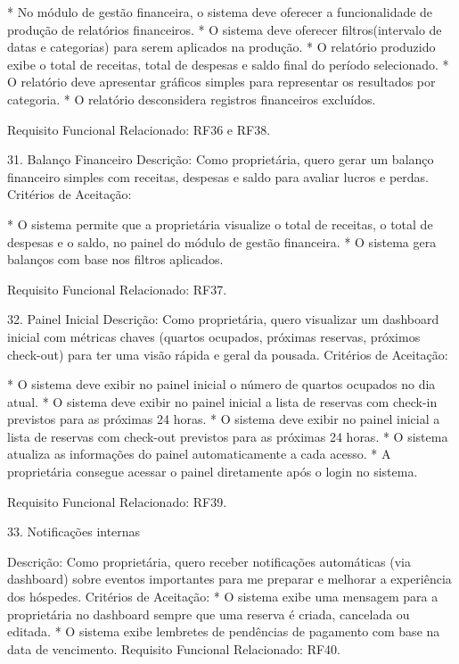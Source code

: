 * No módulo de gestão financeira, o sistema deve oferecer a funcionalidade de produção de relatórios financeiros.
* O sistema deve oferecer filtros(intervalo de datas e categorias) para serem aplicados na produção.
* O relatório produzido exibe o total de receitas, total de despesas e saldo final do período selecionado.
* O relatório deve apresentar gráficos simples para representar os resultados por categoria.
* O relatório desconsidera registros financeiros excluídos.


Requisito Funcional Relacionado: RF36 e RF38.


31.  Balanço Financeiro
Descrição: Como proprietária, quero gerar um balanço financeiro simples com receitas, despesas e saldo para avaliar lucros e perdas. 
Critérios de Aceitação:
 
* O sistema permite que a proprietária visualize o total de receitas, o total de despesas e o saldo, no painel do módulo de gestão financeira.
* O sistema gera balanços com base nos filtros aplicados.


Requisito Funcional Relacionado: RF37.


32. Painel Inicial
Descrição: Como proprietária, quero visualizar um dashboard inicial com métricas chaves (quartos ocupados, próximas reservas, próximos check-out) para ter uma visão rápida e geral da pousada.
Critérios de Aceitação: 


* O sistema deve exibir no painel inicial o número de quartos ocupados no dia atual.
* O sistema deve exibir no painel inicial a lista de reservas com check-in previstos para as próximas 24 horas.
* O sistema deve exibir no painel inicial a lista de reservas com check-out previstos para as próximas 24 horas.
* O sistema atualiza as informações do painel automaticamente a cada acesso.
* A proprietária consegue acessar o painel diretamente após o login no sistema.


Requisito Funcional Relacionado: RF39.


33. Notificações internas


Descrição: Como proprietária, quero receber notificações automáticas (via dashboard) sobre eventos importantes para me preparar e melhorar a experiência dos hóspedes.
Critérios de Aceitação:
* O sistema exibe uma mensagem para a proprietária no dashboard sempre que uma reserva é criada, cancelada ou editada.
* O sistema exibe lembretes de pendências de pagamento com base na data de vencimento.
Requisito Funcional Relacionado: RF40.